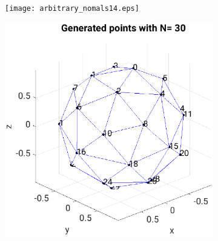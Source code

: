 \begin{figure}[H]
     \centering
     \begin{subfigure}[b]{0.4\textwidth}
         \centering
        \texttt{[image: arbitrary\_nomals14.eps]}
         \label{fig:arbitary_n14}
     \end{subfigure}
     \hfill
     \begin{subfigure}[b]{0.4\textwidth}
         \centering
         \includegraphics[width=1.3\textwidth]{Graphics/arbitrary_nomals30.eps}
         \label{fig:arbitary_n30}
     \end{subfigure}
         \hfill
     \begin{subfigure}[b]{0.4\textwidth}
         \centering

\end{subfigure}
\end{figure}
